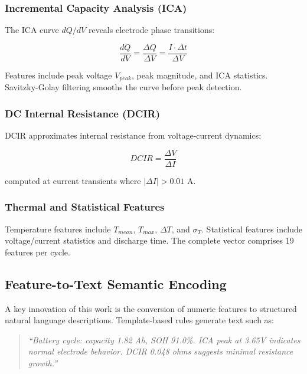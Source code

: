 \documentclass[conference]{IEEEtran}
\begin{document}
\subsubsection{Incremental Capacity Analysis (ICA)}

The ICA curve $dQ/dV$ reveals electrode phase transitions:

\begin{equation}
    \frac{dQ}{dV} = \frac{\Delta Q}{\Delta V} = \frac{I \cdot \Delta t}{\Delta V}
\end{equation}

Features include peak voltage $V_{peak}$, peak magnitude, and ICA statistics. Savitzky-Golay filtering smooths the curve before peak detection.

\subsubsection{DC Internal Resistance (DCIR)}

DCIR approximates internal resistance from voltage-current dynamics:

\begin{equation}
    DCIR = \frac{\Delta V}{\Delta I}
\end{equation}

computed at current transients where $|\Delta I| > 0.01$ A.

\subsubsection{Thermal and Statistical Features}

Temperature features include $T_{mean}$, $T_{max}$, $\Delta T$, and $\sigma_T$. Statistical features include voltage/current statistics and discharge time. The complete vector comprises 19 features per cycle.

\subsection{Feature-to-Text Semantic Encoding}

A key innovation of this work is the conversion of numeric features to structured natural language descriptions. Template-based rules generate text such as:

\begin{quote}
\textit{``Battery cycle: capacity 1.82 Ah, SOH 91.0\%. ICA peak at 3.65V indicates normal electrode behavior. DCIR 0.048 ohms suggests minimal resistance growth.''}
\end{quote}
\end{document}

